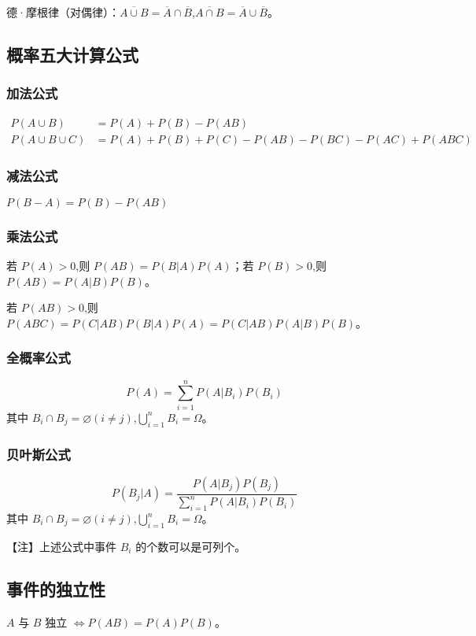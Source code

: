 \documentclass[UTF8]{ctexart}
\theoremstyle{remark}
\begin{document}
	德·摩根律（对偶律）：\(\overline{A \cup B} = \overline{A} \cap \overline{B}\),\(\overline{A \cap B} = \overline{A} \cup \overline{B}\)。
		
	\subsection{概率五大计算公式}
	\subsubsection{加法公式}
	
	\begin{align*}
		P(A \cup B) &= P(A) + P(B) - P(AB)\\
		P(A \cup B \cup C) &= P(A) + P(B) + P(C) - P(AB) - P(BC) - P(AC) + P(ABC)
	\end{align*}
	
	\subsubsection{减法公式}
	\(P(B - A) = P(B) - P(AB)\)
	\subsubsection{乘法公式}
	若 \(P(A) > 0\),则 \(P(AB) = P(B|A)P(A)\)；若 \(P(B) > 0\),则 \(P(AB) = P(A|B)P(B)\)。
	
	若 \(P(AB) > 0\),则 \(P(ABC) = P(C|AB)P(B|A)P(A) = P(C|AB)P(A|B)P(B)\)。
	\subsubsection{全概率公式}
	\[
	P(A) = \sum_{i = 1}^{n} P(A|B_i)P(B_i)
	\]
	其中 \(B_i \cap B_j = \varnothing (i \neq j)\),\(\bigcup_{i = 1}^{n} B_i = \Omega\)。
	
	\subsubsection{贝叶斯公式}
	\[
	P(B_j|A) = \frac{P(A|B_j)P(B_j)}{\sum_{i = 1}^{n} P(A|B_i)P(B_i)}
	\]
	其中 \(B_i \cap B_j = \varnothing (i \neq j)\),\(\bigcup_{i = 1}^{n} B_i = \Omega\)。
	
	【注】上述公式中事件 \(B_i\) 的个数可以是可列个。
	
	\subsection{事件的独立性}
	\(A\) 与 \(B\) 独立 \(\Leftrightarrow P(AB) = P(A)P(B)\)。
	
\end{document}
